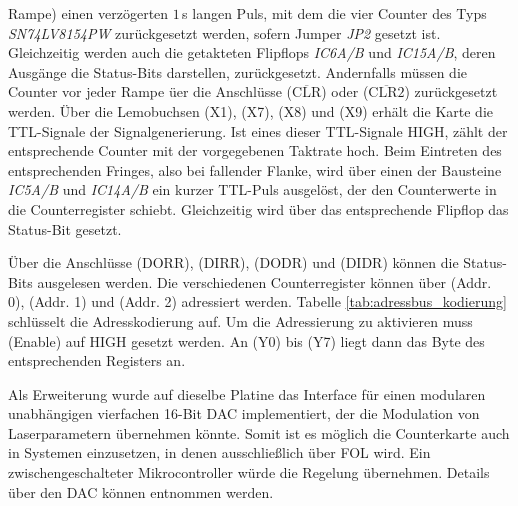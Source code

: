 Rampe) einen verzögerten $1\,$\textmu s langen Puls, mit dem die vier Counter
des Typs \textit{SN74LV8154PW} zurückgesetzt werden, sofern Jumper \textit{JP2}
gesetzt ist. Gleichzeitig werden auch die getakteten Flipflops \textit{IC6A/B}
und \textit{IC15A/B}, deren Ausgänge die Status-Bits darstellen, zurückgesetzt.
Andernfalls müssen die Counter vor jeder Rampe üer die Anschlüsse
($\overline{\text{CLR}}$) oder ($\overline{\text{CLR2}}$) zurückgesetzt werden.
Über die Lemobuchsen (X1), (X7), (X8) und (X9) erhält die Karte die TTL-Signale
der Signalgenerierung. Ist eines dieser TTL-Signale HIGH, zählt der
entsprechende Counter mit der vorgegebenen Taktrate hoch. Beim Eintreten des
entsprechenden Fringes, also bei fallender Flanke, wird über einen der Bausteine
\textit{IC5A/B} und \textit{IC14A/B} ein kurzer TTL-Puls ausgelöst, der den
Counterwerte in die Counterregister schiebt. Gleichzeitig wird über das
entsprechende Flipflop das Status-Bit gesetzt.\par
Über die Anschlüsse (DORR), (DIRR), (DODR) und (DIDR) können die Status-Bits
ausgelesen werden. Die verschiedenen Counterregister können über (Addr. 0),
(Addr. 1) und (Addr. 2) adressiert werden. Tabelle
\ref{tab:adressbus_kodierung} schlüsselt die Adresskodierung auf. Um die
Adressierung zu aktivieren muss (Enable) auf HIGH gesetzt werden. An (Y0) bis (Y7) liegt dann das Byte des entsprechenden Registers an.\par
Als Erweiterung wurde auf dieselbe Platine das Interface für einen modularen
unabhängigen vierfachen 16-Bit DAC implementiert, der die Modulation von
Laserparametern übernehmen könnte. Somit ist es möglich die Counterkarte auch in Systemen einzusetzen, in
denen ausschließlich über FOL wird. Ein
zwischengeschalteter Mikrocontroller würde die Regelung übernehmen. Details über
den DAC können \cite{counterkarte_laserstabilisierung} entnommen werden.
